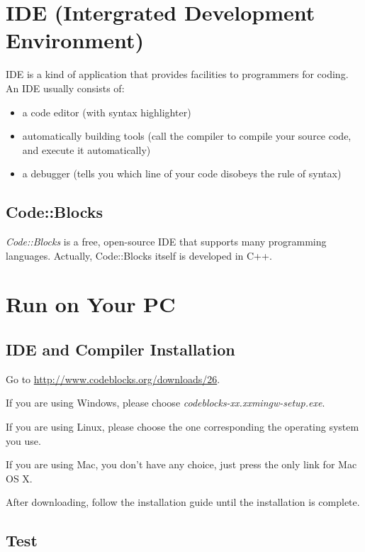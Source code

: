 \documentclass{report}
\begin{document}
\section{IDE (Intergrated Development Environment)}

    IDE is a kind of application that provides facilities to programmers for coding. An IDE usually consists of:
    \begin{itemize}
    \item a code editor (with syntax highlighter)
    \item automatically building tools (call the compiler to compile your source code, and execute it automatically)
    \item a debugger (tells you which line of your code disobeys the rule of syntax)
    \end{itemize}

    \subsection{Code::Blocks}

    \textit{Code::Blocks} is a free, open-source IDE that supports many programming languages. Actually, Code::Blocks itself is developed in C++.

\section{Run on Your PC}

    \subsection{IDE and Compiler Installation}
    
    Go to \url{http://www.codeblocks.org/downloads/26}.

    If you are using Windows, please choose \textit{codeblocks-xx.xxmingw-setup.exe}.

    If you are using Linux, please choose the one corresponding the operating system you use.
        
    If you are using Mac, you don't have any choice, just press the only link for Mac OS X.

    After downloading, follow the installation guide until the installation is complete.

    \subsection{Test}
\end{document}
